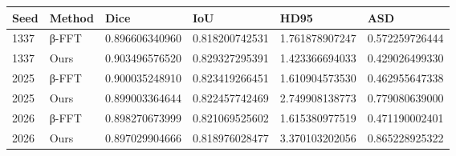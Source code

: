 \begin{tabular}{llllll}
 \toprule
Seed & Method & Dice & IoU & HD95 & ASD \\
 \midrule
1337 & β-FFT & 0.896606340960 & 0.818200742531 & 1.761878907247 & 0.572259726444 \\
1337 & Ours & 0.903496576520 & 0.829327295391 & 1.423366694033 & 0.429026499330 \\
2025 & β-FFT & 0.900035248910 & 0.823419266451 & 1.610904573530 & 0.462955647338 \\
2025 & Ours & 0.899003364644 & 0.822457742469 & 2.749908138773 & 0.779080639000 \\
2026 & β-FFT & 0.898270673999 & 0.821069525602 & 1.615380977519 & 0.471190002401 \\
2026 & Ours & 0.897029904666 & 0.818976028477 & 3.370103202056 & 0.865228925322 \\
 \bottomrule
\end{tabular}
